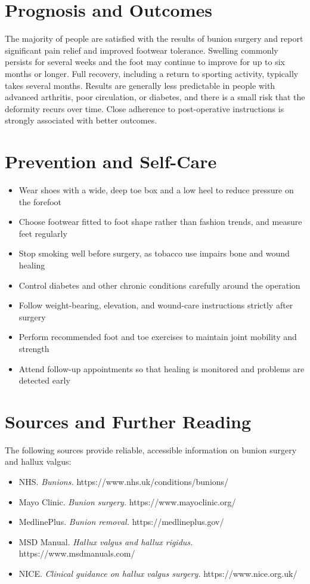 \section*{Prognosis and Outcomes}
The majority of people are satisfied with the results of bunion surgery and report significant pain relief and improved footwear tolerance. Swelling commonly persists for several weeks and the foot may continue to improve for up to six months or longer. Full recovery, including a return to sporting activity, typically takes several months. Results are generally less predictable in people with advanced arthritis, poor circulation, or diabetes, and there is a small risk that the deformity recurs over time. Close adherence to post-operative instructions is strongly associated with better outcomes.

\section*{Prevention and Self-Care}
\begin{itemize}
    \item Wear shoes with a wide, deep toe box and a low heel to reduce pressure on the forefoot
    \item Choose footwear fitted to foot shape rather than fashion trends, and measure feet regularly
    \item Stop smoking well before surgery, as tobacco use impairs bone and wound healing
    \item Control diabetes and other chronic conditions carefully around the operation
    \item Follow weight-bearing, elevation, and wound-care instructions strictly after surgery
    \item Perform recommended foot and toe exercises to maintain joint mobility and strength
    \item Attend follow-up appointments so that healing is monitored and problems are detected early
\end{itemize}

\section*{Sources and Further Reading}
The following sources provide reliable, accessible information on bunion surgery and hallux valgus:
\begin{itemize}
    \item NHS. \textit{Bunions.} https://www.nhs.uk/conditions/bunions/
    \item Mayo Clinic. \textit{Bunion surgery.} https://www.mayoclinic.org/
    \item MedlinePlus. \textit{Bunion removal.} https://medlineplus.gov/
    \item MSD Manual. \textit{Hallux valgus and hallux rigidus.} https://www.msdmanuals.com/
    \item NICE. \textit{Clinical guidance on hallux valgus surgery.} https://www.nice.org.uk/
\end{itemize}
